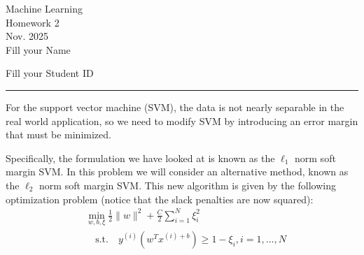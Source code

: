 \documentclass[12pt,letterpaper, onecolumn]{exam}
\begin{document}
\begingroup  
    \centering
    \LARGE Machine Learning\\
    \LARGE Homework 2\\[0.5em]
    \large Nov. 2025\\[0.5em]
    \large Fill your Name\par
    \large Fill your Student ID\par
\endgroup
\rule{\textwidth}{0.4pt}
\pointsdroppedatright   %
\printanswers
\renewcommand{\solutiontitle}{\noindent\textbf{Ans:}\enspace}   %

\begin{questions} 
    \question
    For the support vector machine (SVM), the data is not nearly separable in the real world application, so we need to modify SVM by introducing an error margin that must be minimized. 
    
    Specifically, the formulation we have looked at is known as the $\ell_1$ norm soft margin SVM. In this problem we will consider an alternative method, known as the $\ell_2$ norm soft margin SVM. This new algorithm is given by the following optimization problem (notice that the slack penalties are now squared):
    \begin{equation}
        \begin{split}
            &\mathop{\min}\limits_{w, b, \xi} \frac{1}{2}\| w\|^2 + \frac{C}{2}\sum_{i=1}^{N}\xi_{i}^2\\
            & \quad \text{s.t.} \quad y^{(i)}(w^Tx^{(i) + b})\ge 1-\xi_i, i=1, \dots, N
        \end{split}
    \end{equation}
    
\end{questions}
\end{document}

